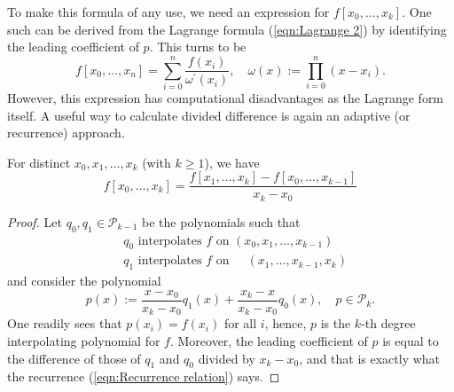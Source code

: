 \documentclass[a4paper]{article}
\begin{document}
To make this formula of any use, we need an expression for $f[x_{0}, \ldots, x_{k}]$. One such can be derived from the Lagrange formula (\ref{eqn:Lagrange 2}) by identifying the leading coefficient of $p$. This turns to be
\[
    f[x_{0}, \ldots, x_{n}]=\sum_{i=0}^{n} \frac{f(x_{i})}{\omega^{\prime}(x_{i})}, \quad \omega(x):=\prod_{i=0}^{n}(x-x_{i}) .
\]
However, this expression has computational disadvantages as the Lagrange form itself. A useful way to calculate divided difference is again an adaptive (or recurrence) approach.
\begin{theorem}
    For distinct $x_{0}, x_{1}, \ldots, x_{k}$ (with $k \geq 1$), we have
    \begin{equation}\label{eqn:Recurrence relation}
        f[x_{0}, \ldots, x_{k}]=\frac{f[x_{1}, \ldots, x_{k}]-f[x_{0}, \ldots, x_{k-1}]}{x_{k}-x_{0}}
    \end{equation}
\end{theorem}
\begin{proof}
    Let $q_{0}, q_{1} \in \mathcal{P}_{k-1}$ be the polynomials such that 
    \begin{align*}
        & q_0 \text{ interpolates } f \text{ on } (x_0,x_1,\dots,x_{k-1})\\ 
        & q_1 \text{ interpolates } f \text{ on } ~ ~ ~ ~ ~ (x_1,\dots,x_{k-1},x_k)
    \end{align*}
    and consider the polynomial
    \[
        p(x):=\frac{x-x_{0}}{x_{k}-x_{0}} q_{1}(x)+\frac{x_{k}-x}{x_{k}-x_{0}} q_{0}(x), \quad p \in \mathcal{P}_{k}.
    \]
    One readily sees that $p(x_{i})=f(x_{i})$ for all $i$, hence, $p$ is the $k$-th degree interpolating polynomial for $f$. Moreover, the leading coefficient of $p$ is equal to the difference of those of $q_{1}$ and $q_{0}$ divided by $x_{k}-x_{0}$, and that is exactly what the recurrence (\ref{eqn:Recurrence relation}) says.
\end{proof}
\end{document}
